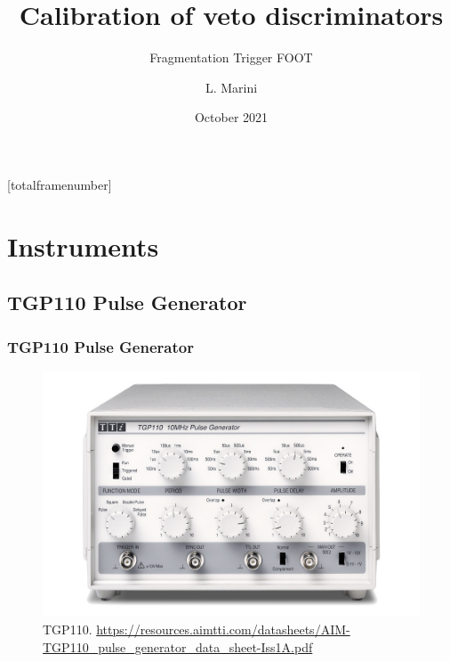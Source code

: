 \documentclass[9pt]{beamer}
\title[Calibration of veto discriminators]{Calibration of veto discriminators}
\subtitle[]{Fragmentation Trigger FOOT}
\author[L. Marini, INFN Pisa ]{L. Marini}
\institute{INFN Pisa}
\date[October 2021]{October 2021}
\begin{document}
[totalframenumber] 

\frame{\titlepage}



\begin{frame} 
  	\tableofcontents
\end{frame}







\section{Instruments}
\subsection{TGP110 Pulse Generator}
\begin{frame} [fragile]
\small
	\frametitle{TGP110 Pulse Generator}
    		\begin{figure}
		 \centering
			\includegraphics[scale=0.25]{figures/instruments/AIM_TGP110_1k_0.jpg}
			\caption{TGP110. \url{https://resources.aimtti.com/datasheets/AIM-TGP110_pulse_generator_data_sheet-Iss1A.pdf}}
		\end{figure}
\end{frame}
\end{document}

